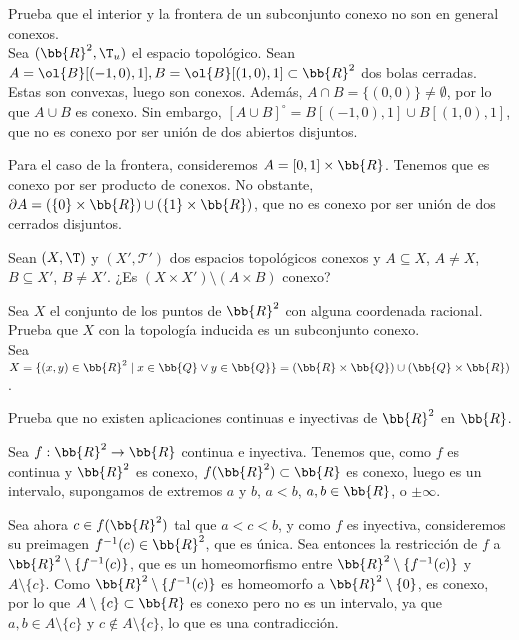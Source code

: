 \begin{ejercicio}
    Prueba que el interior y la frontera de un subconjunto conexo no son en general conexos.\\

    Sea $(\bb{R}^2,\T_u)$ el espacio topológico. Sean $A=\ol{B}[(-1,0), 1], B=\ol{B}[(1,0), 1]\subset \bb{R}^2$ dos bolas cerradas. Estas son convexas, luego son conexos. Además, $A\cap B=\{(0,0)\}\neq \emptyset$, por lo que
    $A\cup B$ es conexo. Sin embargo, $[A\cup B]^\circ=B[(-1,0),1] \cup B[(1,0),1]$, que no es conexo por ser unión de dos abiertos disjuntos.

    Para el caso de la frontera, consideremos $A=[0,1]\times \bb{R}$. Tenemos que es conexo por ser producto de conexos.
    No obstante, $\partial A = (\{0\}\times \bb{R}) \cup (\{1\}\times \bb{R})$, que no es conexo por ser unión de dos cerrados disjuntos.


\end{ejercicio}

\begin{ejercicio}
    Sean $(X, \T)$ y $(X', \mathcal{T'})$ dos espacios topológicos conexos y $A \subseteq X$, $A\neq X$, $B \subseteq X'$, $B\neq X'$. ¿Es $(X \times X') \setminus (A \times B)$ conexo?

\end{ejercicio}

\begin{ejercicio}
    Sea $X$ el conjunto de los puntos de $ \bb{R}^2 $ con alguna coordenada racional. Prueba que $X$ con la topología inducida es un subconjunto conexo.\\

    Sea $X=\{(x,y)\in \bb{R}^2 \mid x\in \bb{Q} \lor y\in \bb{Q}\}=(\bb{R}\times \bb{Q}) \cup (\bb{Q}\times \bb{R})$.
\end{ejercicio}

\begin{ejercicio}
    Prueba que no existen aplicaciones continuas e inyectivas de $\bb{R}^2$ en $\bb{R}$.

    Sea $f:\bb{R}^2\to \bb{R}$ continua e inyectiva. Tenemos que, como $f$ es continua y $\bb{R}^2$ es conexo, $f(\bb{R}^2)\subset \bb{R}$ es conexo, luego es un intervalo, supongamos de extremos
    $a$ y $b$, $a<b$, $a,b\in \bb{R}$, o $\pm \infty$.

    Sea ahora $c\in f(\bb{R}^2)$ tal que $a<c<b$, y como $f$ es inyectiva, consideremos su preimagen $f^{-1}(c)\in \bb{R}^2$, que es única.
    Sea entonces la restricción de $f$ a $\bb{R}^2\setminus \{f^{-1}(c)\}$,
    que es un homeomorfismo entre $\bb{R}^2\setminus \{f^{-1}(c)\}$ y $A\setminus \{c\}$. Como $\bb{R}^2\setminus \{f^{-1}(c)\}$ es homeomorfo a $\bb{R}^2\setminus \{0\}$, es conexo, por lo que
    $A\setminus \{c\}\subset \bb{R}$ es conexo pero no es un intervalo, ya que $a,b\in A\setminus \{c\}$ y $c\notin A\setminus \{c\}$, lo que es una contradicción.
\end{ejercicio}

